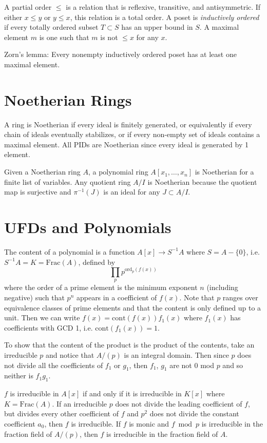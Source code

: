 \documentclass{article}
\begin{document}
A partial order $\leq$ is a relation that is reflexive, transitive, and
antisymmetric. If either $x \leq y$ or $y \leq x$, this relation is a
total order. A poset is \emph{inductively ordered} if every totally
ordered subset $T \subset S$ has an upper bound in $S$. A maximal
element $m$ is one such that $m$ is not $\leq x$ for any $x$.

Zorn's lemma: Every nonempty inductively ordered poset has at least
one maximal element.


\section{Noetherian Rings}
A ring is Noetherian if every ideal is finitely generated, or
equivalently if every chain of ideals eventually stabilizes, or if
every non-empty set of ideals contains a maximal element. All PIDs
are Noetherian since every ideal is generated by 1 element.

Given a Noetherian ring $A$, a polynomial ring $A[x_1, \dots, x_n]$ is
Noetherian for a finite list of variables. Any quotient ring $A / I$
is Noetherian because the quotient map is surjective and $\pi^{-1}(J)$
is an ideal for any $J \subset A / I$.

\section{UFDs and Polynomials}
The content of a polynomial is a function $A[x] \to S^{-1}A$ where
$S = A - \{ 0 \}$, i.e. $S^{-1} A = K = \mathrm{Frac}(A)$, defined by
$$
\prod_p p^{\mathrm{ord}_p(f(x))}
$$
where the order of a prime element is the minimum exponent $n$
(including negative) such that $p^n$ appears in a coefficient of
$f(x)$. Note that $p$ ranges over equivalence classes of prime
elements and that the content is only defined up to a unit. Then we
can write $f(x) = \mathrm{cont}(f(x)) f_1(x)$ where $f_1(x)$ has
coefficients with GCD 1, i.e. $\mathrm{cont}(f_1(x)) = 1$.

To show that the content of the product is the product of the
contents, take an irreducible $p$ and notice that $A / (p)$ is an
integral domain. Then since $p$ does not divide all the coefficients
of $f_1$ or $g_1$, then $f_1$, $g_1$ are not 0 mod $p$ and so neither
is $f_1 g_1$.

$f$ is irreducible in $A[x]$ if and only if it is irreducible in
$K[x]$ where $K = \mathrm{Frac}(A)$. If an irreducible $p$ does not
divide the leading coefficient of $f$, but divides every other
coefficient of $f$ and $p^2$ does not divide the constant coefficient
$a_0$, then $f$ is irreducible.
If $f$ is monic and $f \bmod p$ is irreducible in the fraction field
of $A / (p)$, then $f$ is irreducible in the fraction field of $A$.
\end{document}
